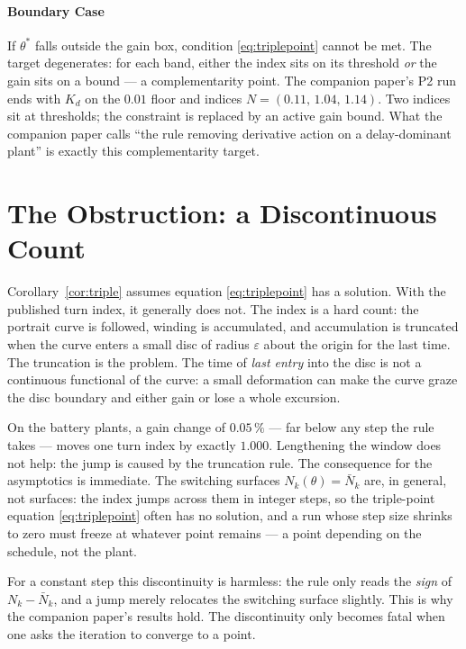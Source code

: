 \documentclass[twocolumn]{ifacconf}
\newcommand{\Nbar}{\bar{N}}
\begin{document}
\paragraph{Boundary Case} If $\theta^*$ falls outside the gain box, condition
\eqref{eq:triplepoint} cannot be met. The target degenerates: for each band,
either the index sits on its threshold \emph{or} the gain sits on a bound --- a
complementarity point. The companion paper's P2 run ends with $K_d$ on the
$0.01$ floor and indices $N = (0.11,\, 1.04,\, 1.14)$. Two indices sit at
thresholds; the constraint is replaced by an active gain bound. What the
companion paper calls ``the rule removing derivative action on a delay-dominant
plant'' is exactly this complementarity target.

\section{The Obstruction: a Discontinuous Count}
\label{sec:obstruction}

Corollary~\ref{cor:triple} assumes equation \eqref{eq:triplepoint} has a
solution. With the published turn index, it generally does not. The index is a
hard count: the portrait curve is followed, winding is accumulated, and
accumulation is truncated when the curve enters a small disc of radius
$\varepsilon$ about the origin for the last time. The truncation is the
problem. The time of \emph{last entry} into the disc is not a continuous
functional of the curve: a small deformation can make the curve graze the disc
boundary and either gain or lose a whole excursion.

On the battery plants, a gain change of $0.05\,\%$ --- far below any step the
rule takes --- moves one turn index by exactly $1.000$. Lengthening the window
does not help: the jump is caused by the truncation rule. The consequence for
the asymptotics is immediate. The switching surfaces $N_k(\theta) = \Nbar_k$
are, in general, not surfaces: the index jumps across them in integer steps, so
the triple-point equation \eqref{eq:triplepoint} often has no solution, and a
run whose step size shrinks to zero must freeze at whatever point remains ---
a point depending on the schedule, not the plant.

For a constant step this discontinuity is harmless: the rule only reads the
\emph{sign} of $N_k - \Nbar_k$, and a jump merely relocates the switching
surface slightly. This is why the companion paper's results hold. The
discontinuity only becomes fatal when one asks the iteration to converge to a
point.
\end{document}
